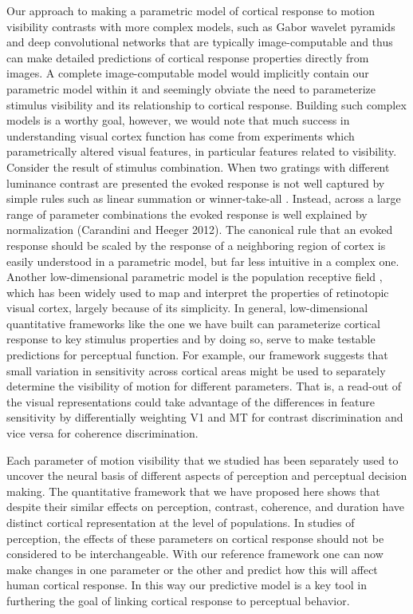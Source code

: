 \documentclass{report}
\begin{document}
Our approach to making a parametric model of cortical response to motion visibility contrasts with more complex models, such as Gabor wavelet pyramids and deep convolutional networks \citep{Kay2008-mj,Kay2017-bj,Yamins2014-rm} that are typically image-computable and thus can make detailed predictions of cortical response properties directly from images. A complete image-computable model would implicitly contain our parametric model within it and seemingly obviate the need to parameterize stimulus visibility and its relationship to cortical response. Building such complex models is a worthy goal, however, we would note that much success in understanding visual cortex function has come from experiments which parametrically altered visual features, in particular features related to visibility. Consider the result of stimulus combination. When two gratings with different luminance contrast are presented the evoked response is not well captured by simple rules such as linear summation or winner-take-all \citep{Busse2009-pt}. Instead, across a large range of parameter combinations the evoked response is well explained by normalization (Carandini and Heeger 2012). The canonical rule that an evoked response should be scaled by the response of a neighboring region of cortex is easily understood in a parametric model, but far less intuitive in a complex one. Another low-dimensional parametric model is the population receptive field \citep{Dumoulin2008-uc,Wandell2015-uv}, which has been widely used to map and interpret the properties of retinotopic visual cortex, largely because of its simplicity. In general, low-dimensional quantitative frameworks like the one we have built can parameterize cortical response to key stimulus properties and by doing so, serve to make testable predictions for perceptual function. For example, our framework suggests that small variation in sensitivity across cortical areas might be used to separately determine the visibility of motion for different parameters. That is, a read-out of the visual representations could take advantage of the differences in feature sensitivity by differentially weighting V1 and MT for contrast discrimination and vice versa for coherence discrimination.

Each parameter of motion visibility that we studied has been separately used to uncover the neural basis of different aspects of perception and perceptual decision making. The quantitative framework that we have proposed here shows that despite their similar effects on perception, contrast, coherence, and duration have distinct cortical representation at the level of populations. In studies of perception, the effects of these parameters on cortical response should not be considered to be interchangeable. With our reference framework one can now make changes in one parameter or the other and predict how this will affect human cortical response. In this way our predictive model is a key tool in furthering the goal of linking cortical response to perceptual behavior.
\end{document}
